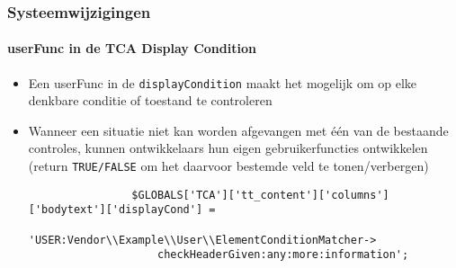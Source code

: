 \begin{frame}[fragile]
	\frametitle{Systeemwijzigingen}
	\framesubtitle{userFunc in de TCA Display Condition}

	\begin{itemize}
		\item Een userFunc in de \texttt{displayCondition} maakt het mogelijk om op elke denkbare conditie of toestand te controleren 
		\item Wanneer een situatie niet kan worden afgevangen met één van de bestaande controles, 
			kunnen ontwikkelaars hun eigen gebruikerfuncties ontwikkelen 
			(return \texttt{TRUE/FALSE} om het daarvoor bestemde veld te tonen/verbergen)

			\begin{lstlisting}
				$GLOBALS['TCA']['tt_content']['columns']['bodytext']['displayCond'] =
				  'USER:Vendor\\Example\\User\\ElementConditionMatcher->
				    checkHeaderGiven:any:more:information';
			\end{lstlisting}

	\end{itemize}

\end{frame}


